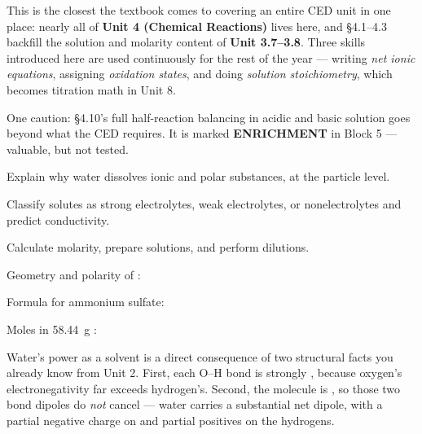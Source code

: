 \documentclass{apchem-notes}
\begin{document}
\apctitleblock

\begin{apcnote}
This is the closest the textbook comes to covering an entire CED unit in one
place: nearly all of \textbf{Unit 4 (Chemical Reactions)} lives here, and
\S4.1--4.3 backfill the solution and molarity content of \textbf{Unit
3.7--3.8}. Three skills introduced here are used continuously for the rest
of the year --- writing \emph{net ionic equations}, assigning
\emph{oxidation states}, and doing \emph{solution stoichiometry}, which
becomes titration math in Unit 8.

One caution: \S4.10's full half-reaction balancing in acidic and basic
solution goes beyond what the CED requires. It is marked
\textbf{ENRICHMENT} in Block 5 --- valuable, but not tested.
\end{apcnote}


\begin{objectives}
  \item Explain why water dissolves ionic and polar substances, at the
        particle level.
  \item Classify solutes as strong electrolytes, weak electrolytes, or
        nonelectrolytes and predict conductivity.
  \item Calculate molarity, prepare solutions, and perform dilutions.
\end{objectives}


\begin{warmup}[3]
  \item Geometry and polarity of : 
  \item Formula for ammonium sulfate: 
  \item Moles in \SI{58.44}{\gram} : 
\end{warmup}



Water's power as a solvent is a direct consequence of two structural facts
you already know from Unit 2. First, each O--H bond is strongly
, because oxygen's electronegativity far exceeds
hydrogen's. Second, the molecule is , so those two
bond dipoles do \emph{not} cancel --- water carries a substantial net
dipole, with a partial negative charge on  and
partial positives on the hydrogens.
\end{document}
